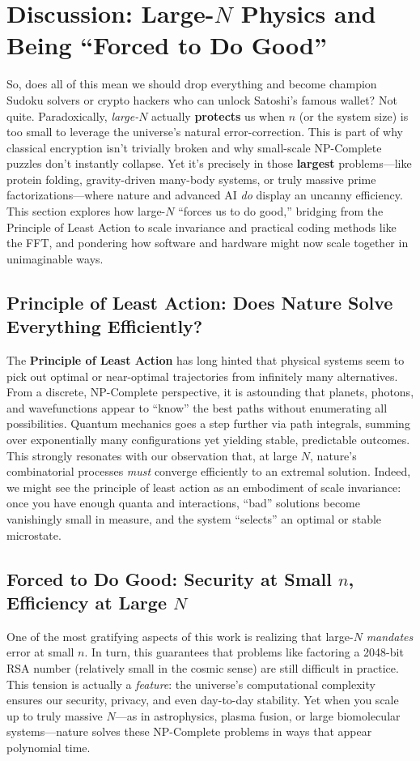\documentclass{report}
\begin{document}
\section*{Discussion: Large-$N$ Physics and Being ``Forced to Do Good''}

So, does all of this mean we should drop everything and become champion Sudoku solvers or crypto hackers who can unlock Satoshi’s famous wallet? Not quite. Paradoxically, \emph{large-$N$} actually \textbf{protects} us when $n$ (or the system size) is too small to leverage the universe’s natural error-correction. This is part of why classical encryption isn’t trivially broken and why small-scale NP-Complete puzzles don’t instantly collapse. Yet it’s precisely in those \textbf{largest} problems—like protein folding, gravity-driven many-body systems, or truly massive prime factorizations—where nature and advanced AI \emph{do} display an uncanny efficiency. This section explores how large-$N$ ``forces us to do good,” bridging from the Principle of Least Action to scale invariance and practical coding methods like the FFT, and pondering how software and hardware might now scale together in unimaginable ways.

\subsection*{Principle of Least Action: Does Nature Solve Everything Efficiently?}
The \textbf{Principle of Least Action} has long hinted that physical systems seem to pick out optimal or near-optimal trajectories from infinitely many alternatives. From a discrete, NP-Complete perspective, it is astounding that planets, photons, and wavefunctions appear to “know” the best paths without enumerating all possibilities. Quantum mechanics goes a step further via path integrals, summing over exponentially many configurations yet yielding stable, predictable outcomes. This strongly resonates with our observation that, at large $N$, nature’s combinatorial processes \emph{must} converge efficiently to an extremal solution. Indeed, we might see the principle of least action as an embodiment of scale invariance: once you have enough quanta and interactions, “bad” solutions become vanishingly small in measure, and the system “selects” an optimal or stable microstate.

\subsection*{Forced to Do Good: Security at Small $n$, Efficiency at Large $N$}
One of the most gratifying aspects of this work is realizing that large-$N$ \emph{mandates} error at small $n$. In turn, this guarantees that problems like factoring a 2048-bit RSA number (relatively small in the cosmic sense) are still difficult in practice. This tension is actually a \emph{feature}: the universe’s computational complexity ensures our security, privacy, and even day-to-day stability. Yet when you scale up to truly massive $N$—as in astrophysics, plasma fusion, or large biomolecular systems—nature solves these NP-Complete problems in ways that appear polynomial time.
\end{document}
